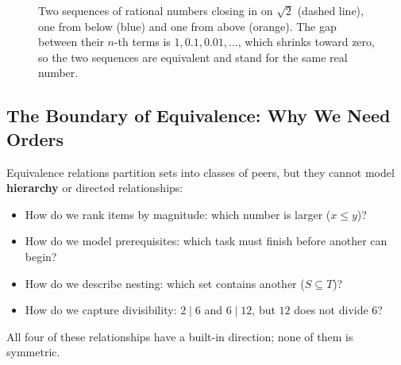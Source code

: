 \begin{figure}[htbp]
\centering
{}
\caption{Two sequences of rational numbers closing in on $\sqrt{2}$ (dashed line), one from below (blue) and one from above (orange). The gap between their $n$-th terms is $1, 0.1, 0.01, \dots$, which shrinks toward zero, so the two sequences are equivalent and stand for the same real number.}
\label{15:fig-cauchy}
\end{figure}

\subsection{The Boundary of Equivalence: Why We Need Orders}

Equivalence relations partition sets into classes of peers, but they cannot model \textbf{hierarchy} or directed relationships:
\begin{itemize}
\item How do we rank items by magnitude: which number is larger ($x \le y$)?
\item How do we model prerequisites: which task must finish before another can begin?
\item How do we describe nesting: which set contains another ($S \subseteq T$)?
\item How do we capture divisibility: $2 \mid 6$ and $6 \mid 12$, but $12$ does not divide $6$?
\end{itemize}

All four of these relationships have a built-in direction; none of them is symmetric.

